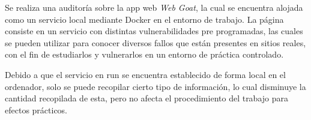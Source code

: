 \documentclass[12pt,oneside,a4paper]{book}
\begin{document}
    \vspace{2em}
        
    \hspace{20pt}
    Se realiza una auditoría sobre la app web \textit{Web Goat}, la cual se encuentra alojada como un servicio local mediante Docker en el entorno de trabajo. La página consiste en un servicio con distintas vulnerabilidades pre programadas, las cuales se pueden utilizar para conocer diversos fallos que están presentes en sitios reales, con el fin de estudiarlos y vulnerarlos en un entorno de práctica controlado.
    
    \hspace{20pt}
    Debido a que el servicio en run se encuentra establecido de forma local en el ordenador, solo se puede recopilar cierto tipo de información, lo cual disminuye la cantidad recopilada de esta, pero no afecta el procedimiento del trabajo para efectos prácticos.
    
    \vspace{1em}
\end{document}
